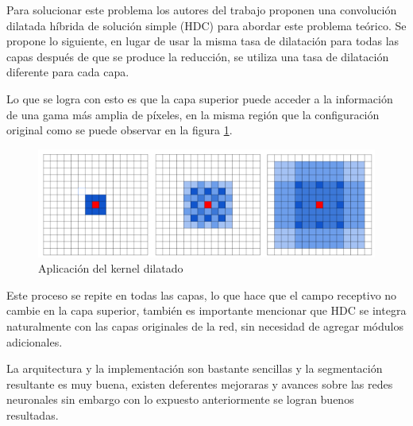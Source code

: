 \documentclass[conference,compsoc]{IEEEtran}
\begin{document}
Para solucionar este problema los autores del trabajo\cite{segconv} proponen una convolución dilatada híbrida de solución simple (HDC) para abordar este problema teórico. Se propone lo siguiente, en lugar de usar la misma tasa de dilatación para todas las capas después de que se produce la reducción, se utiliza una tasa de dilatación diferente para cada capa.

Lo que se logra con esto es que la capa superior puede acceder a la información de una gama más amplia de píxeles, en la misma región que la configuración original como se puede observar en la figura \ref{fig:condensacion}.

\begin{figure}[H]
\centering
\includegraphics[scale=0.5]{condensacion.png}
\caption{\label{fig:condensacion}Aplicación del kernel dilatado}
\end{figure}
Este proceso se repite en todas las capas, lo que hace que el campo receptivo no cambie en la capa superior, también es importante mencionar que HDC se integra naturalmente con las capas originales de la red, sin necesidad de agregar módulos adicionales.

La arquitectura y la implementación son bastante sencillas y la segmentación resultante es muy buena, existen deferentes mejoraras y avances sobre las redes neuronales sin embargo con lo expuesto anteriormente se logran buenos resultadas.

\end{document}
